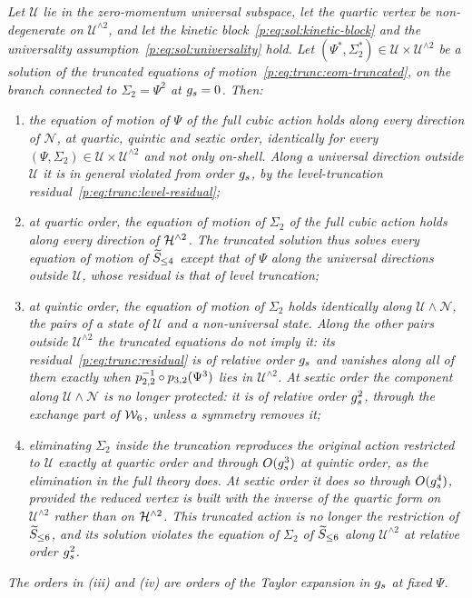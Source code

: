 \emph{Let $\mathcal U$ lie in the zero-momentum universal subspace, let the quartic vertex be non-degenerate on $\mathcal U^{\wedge 2}$, and let the kinetic block~\eqref{p:eq:sol:kinetic-block} and the universality assumption~\eqref{p:eq:sol:universality} hold.
  Let $(\Psi^*, \Sigma_2^*) \in \mathcal U \times \mathcal U^{\wedge 2}$ be a solution of the truncated equations of motion~\eqref{p:eq:trunc:eom-truncated}, on the branch connected to $\Sigma_2 = \Psi^2$ at $\gs = 0$.
  Then:}
\begin{enumerate}[label=(\roman*)]
  \setlength{\itemsep}{0.5ex}

  \item \emph{the equation of motion of $\Psi$ of the full cubic action holds along every direction of $\mathcal N$, at quartic, quintic and sextic order, identically for every $(\Psi, \Sigma_2) \in \mathcal U \times \mathcal U^{\wedge 2}$ and not only on-shell.
      Along a universal direction outside $\mathcal U$ it is in general violated from order $\gs$, by the level-truncation residual~\eqref{p:eq:trunc:level-residual};}

  \item \emph{at quartic order, the equation of motion of $\Sigma_2$ of the full cubic action holds along every direction of $\Hn{2}$.
      The truncated solution thus solves every equation of motion of $\caction[\le 4]$ except that of $\Psi$ along the universal directions outside $\mathcal U$, whose residual is that of level truncation;}

  \item \emph{at quintic order, the equation of motion of $\Sigma_2$ holds identically along $\mathcal U \wedge \mathcal N$, the pairs of a state of $\mathcal U$ and a non-universal state.
      Along the other pairs outside $\mathcal U^{\wedge 2}$ the truncated equations do not imply it: its residual~\eqref{p:eq:trunc:residual} is of relative order $\gs$ and vanishes along all of them exactly when $\sprod{2}{2}^{-1} \circ \sprod{3}{2}(\Psi^3)$ lies in $\mathcal U^{\wedge 2}$.
      At sextic order the component along $\mathcal U \wedge \mathcal N$ is no longer protected: it is of relative order $\gs^2$, through the exchange part of $\dvertex{6}$, unless a symmetry removes it;}

  \item \emph{eliminating $\Sigma_2$ inside the truncation reproduces the original action restricted to $\mathcal U$ exactly at quartic order and through $O(\gs^3)$ at quintic order, as the elimination in the full theory does.
      At sextic order it does so through $O(\gs^4)$, provided the reduced vertex is built with the inverse of the quartic form on $\mathcal U^{\wedge 2}$ rather than on $\Hn{2}$.
      This truncated action is no longer the restriction of $\caction[\le 6]$, and its solution violates the equation of $\Sigma_2$ of $\caction[\le 6]$ along $\mathcal U^{\wedge 2}$ at relative order $\gs^2$.}
\end{enumerate}
\emph{The orders in (iii) and (iv) are orders of the Taylor expansion in $\gs$ at fixed $\Psi$.}

